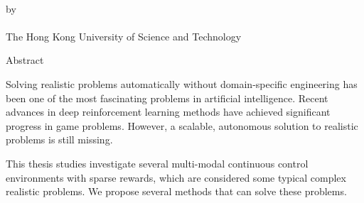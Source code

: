 \begin{center}
{\Large \thesistitle}\\
\vspace{20mm}
by \thesisauthor\\
\vspace{15mm}
\departmentname\\
\vspace{10mm}
The Hong Kong University of Science and Technology
\end{center}
\vspace{8mm}
\begin{center}
Abstract

Solving realistic problems automatically without domain-specific engineering has been one of the most fascinating problems in artificial intelligence. Recent advances in deep reinforcement learning methods have achieved significant progress in game problems. However, a scalable, autonomous solution to realistic problems is still missing.

This thesis studies investigate several multi-modal continuous control environments with sparse rewards, which are considered some typical complex realistic problems. We propose several methods that can solve these problems.
\end{center}
\par
\noindent


